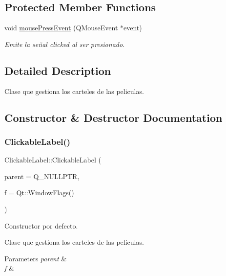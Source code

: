 \subsection*{Protected Member Functions}
\begin{DoxyCompactItemize}
\item 
void \hyperlink{classClickableLabel_a602a8b3a3fa31497f31e549d46576524}{mouse\+Press\+Event} (Q\+Mouse\+Event $\ast$event)
\begin{DoxyCompactList}\small\item\em Emite la señal clicked al ser presionado. \end{DoxyCompactList}\end{DoxyCompactItemize}


\subsection{Detailed Description}
Clase que gestiona los carteles de las peliculas. 

\subsection{Constructor \& Destructor Documentation}
\mbox{\label{classClickableLabel_ac2846619ea62f7fd6ac799d09302b786}} 
\subsubsection{\texorpdfstring{Clickable\+Label()}{ClickableLabel()}}
{\footnotesize\ttfamily Clickable\+Label\+::\+Clickable\+Label (\begin{DoxyParamCaption}\item[{Q\+Widget $\ast$}]{parent = {\ttfamily Q\+\_\+NULLPTR},  }\item[{Qt\+::\+Window\+Flags}]{f = {\ttfamily Qt\+:\+:WindowFlags()} }\end{DoxyParamCaption})\hspace{0.3cm}{\ttfamily [explicit]}}



Constructor por defecto. 

Clase que gestiona los carteles de las peliculas.


\begin{DoxyParams}{Parameters}
{\em parent} & \\
\hline
{\em f} & \\
\hline
\end{DoxyParams}


